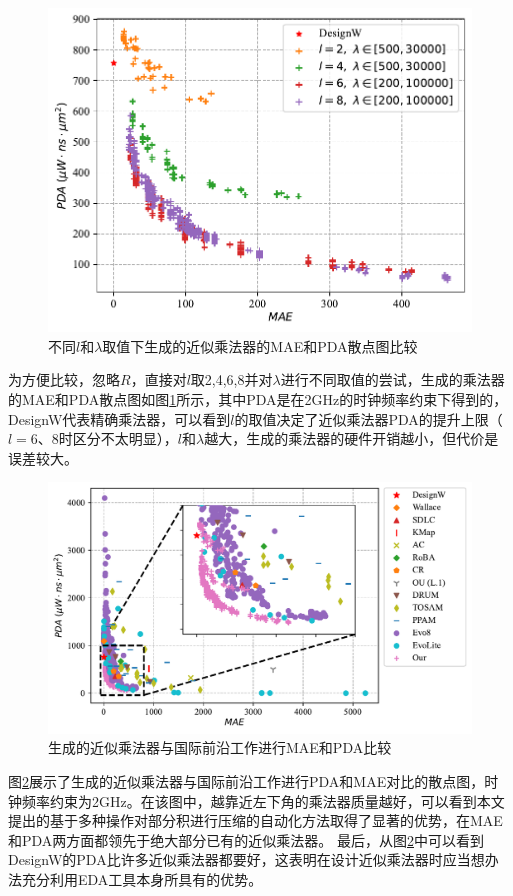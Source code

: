 \begin{figure}[!h]
    \centering
    \includegraphics[width=0.8\linewidth]{figs/AC-AM-Adapt-uniform_8x8_diff_l}
    \caption{不同$l$和$\lambda$取值下生成的近似乘法器的MAE和PDA散点图比较}
    \label{AC:AM:Adapt:Fig:uniform_8x8_diff_l}
\end{figure}

为方便比较，忽略$R$，直接对$l$取2,4,6,8并对$\lambda$进行不同取值的尝试，生成的乘法器的MAE和PDA散点图如图\ref{AC:AM:Adapt:Fig:uniform_8x8_diff_l}所示，其中PDA是在2GHz的时钟频率约束下得到的，DesignW代表精确乘法器，可以看到$l$的取值决定了近似乘法器PDA的提升上限（$l=6$、8时区分不太明显），$l$和$\lambda$越大，生成的乘法器的硬件开销越小，但代价是误差较大。

\begin{figure}[!h]
    \centering
    \includegraphics[width=\linewidth]{figs/AC-AM-Adapt-uniform_8x8_PDA_MAE.pdf}
    \caption{生成的近似乘法器与国际前沿工作进行MAE和PDA比较}
    \label{AC:AM:Adapt:Fig:uniform_8x8_PDA_MAE}
\end{figure}
图\ref{AC:AM:Adapt:Fig:uniform_8x8_PDA_MAE}展示了生成的近似乘法器与国际前沿工作进行PDA和MAE对比的散点图，时钟频率约束为2GHz。在该图中，越靠近左下角的乘法器质量越好，可以看到本文提出的基于多种操作对部分积进行压缩的自动化方法取得了显著的优势，在MAE和PDA两方面都领先于绝大部分已有的近似乘法器。
最后，从图\ref{AC:AM:Adapt:Fig:uniform_8x8_PDA_MAE}中可以看到DesignW的PDA比许多近似乘法器都要好，这表明在设计近似乘法器时应当想办法充分利用EDA工具本身所具有的优势。


